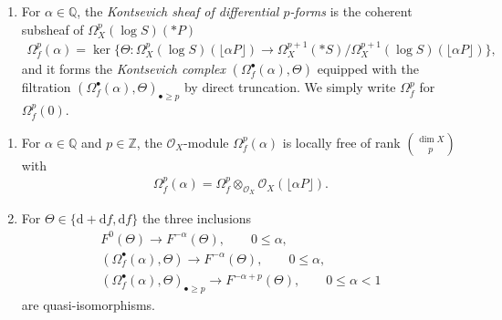 \documentclass[pdftex]{sigma}
\newcommand{\QQ}{\mathbb{Q}}
\newcommand{\ZZ}{\mathbb{Z}}
\newcommand{\sO}{\mathscr{O}}
\newcommand{\de}{\mathrm{d}}
\newcommand{\ddRH}{\Theta}
\newcommand{\flr}[1]{\lfloor #1 \rfloor}
\begin{document}
\begin{definition*}
\begin{enumerate}
\item[(iv)] For $\alpha\in\QQ$, the \textit{Kontsevich sheaf of differential $p$-forms} is the coherent subsheaf of $\Omega_X^p(\log S)(*P)$
\begin{gather*} \Omega_f^p(\alpha) = \ker\big\{ \ddRH\colon \Omega_X^p(\log S)(\flr{\alpha P}) \to \Omega_X^{p+1}(*S)/\Omega_X^{p+1}(\log S)(\flr{\alpha P}) \big\}, \end{gather*}
and it forms the \textit{Kontsevich complex} $(\Omega_f^\bullet(\alpha), \ddRH)$ equipped with the filtration $(\Omega_f^\bullet(\alpha), \ddRH)_{\bullet\geq p}$ by direct truncation. We simply write $\Omega_f^p$ for $\Omega_f^p(0)$.
\end{enumerate}
\end{definition*}

\begin{proposition}\label{Prop:Kont-Log}\quad
\begin{enumerate}\itemsep=0pt
\item For $\alpha\in\QQ$ and $p\in\ZZ$, the $\sO_X$-module $\Omega_f^p(\alpha)$ is locally free of rank $\binom{\dim X}{p}$ with
\begin{gather*} \Omega_f^p(\alpha) = \Omega_f^p \otimes_{\sO_X}\sO_X(\flr{\alpha P}). \end{gather*}
\item For $\ddRH\in\{\de +\de f, \de f\}$ the three inclusions
\begin{gather*}
F^0(\ddRH) \to F^{-\alpha}(\ddRH), \qquad 0\leq \alpha, \\
(\Omega_f^\bullet(\alpha),\ddRH) \to F^{-\alpha}(\ddRH), \qquad 0\leq \alpha, \\
(\Omega_f^\bullet(\alpha),\ddRH)_{\bullet\geq p} \to F^{-\alpha +p}(\ddRH), \qquad 0\leq \alpha <1
\end{gather*}
are quasi-isomorphisms.
\end{enumerate}
\end{proposition}
\end{document}
